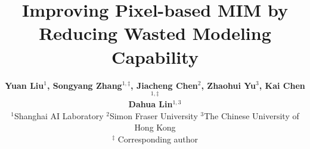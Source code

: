 \documentclass[10pt,twocolumn,letterpaper]{article}
\begin{document}
\title{Improving Pixel-based MIM by Reducing Wasted Modeling Capability}

\author{
  \hspace{-0.25cm}\textbf{Yuan Liu$^{1}$, Songyang Zhang$^{1,\ddagger}$, Jiacheng Chen$^2$, Zhaohui Yu$^3$, Kai Chen$^{1,\ddagger}$} \\
  \hspace{-0.25cm}\textbf{Dahua Lin$^{1,3}$} \\ 
 \hspace{-0.25cm}$^1$Shanghai AI Laboratory \quad $^2$Simon Fraser University \quad $^3$The Chinese University of Hong Kong \\
 \normalsize{\hspace{-1em}$^{\ddagger}$ Corresponding author} \\
  }

\maketitle
\ificcvfinal\thispagestyle{empty}\fi












{\small


}


\end{document}
